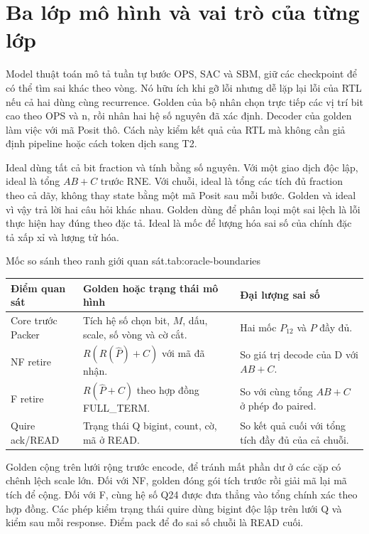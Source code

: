 \section{Ba lớp mô hình và vai trò của từng lớp}

Model thuật toán mô tả tuần tự bước OPS, SAC và SBM, giữ các
checkpoint để có thể tìm sai khác theo vòng. Nó hữu ích khi
gỡ lỗi nhưng dễ lặp lại lỗi của RTL nếu cả hai dùng cùng
recurrence. Golden của bộ nhân chọn trực tiếp các vị trí
bit cao theo OPS và n, rồi nhân hai hệ số nguyên đã xác định.
Decoder của golden làm việc với mã Posit thô. Cách này kiểm
kết quả của RTL mà không cần giả định pipeline hoặc cách
token dịch sang T2.

Ideal dùng tất cả bit fraction và tính bằng số nguyên.
Với một giao dịch độc lập, ideal là tổng $AB+C$ trước RNE.
Với chuỗi, ideal là tổng các tích đủ fraction theo cả dãy,
không thay state bằng một mã Posit sau mỗi bước. Golden và
ideal vì vậy trả lời hai câu hỏi khác nhau. Golden dùng
để phân loại một sai lệch là lỗi thực hiện hay đúng theo
đặc tả. Ideal là mốc để lượng hóa sai số của chính đặc tả
xấp xỉ và lượng tử hóa.

\begin{engineeringtable}{Mốc so sánh theo ranh giới quan sát.}{tab:oracle-boundaries}
\begin{tabularx}{\linewidth}{@{}>{\raggedright\arraybackslash}p{32mm}Y Y@{}}
\toprule
Điểm quan sát & Golden hoặc trạng thái mô hình & Đại lượng sai số \\
\midrule
Core trước Packer & Tích hệ số chọn bit, $M$, dấu, scale, số vòng và cờ cắt. & Hai mốc $P_{12}$ và $P$ đầy đủ. \\
NF retire & $R(R(\widehat P)+C)$ với mã đã nhận. & So giá trị decode của D với $AB+C$. \\
F retire & $R(\widehat P+C)$ theo hợp đồng FULL\_TERM. & So với cùng tổng $AB+C$ ở phép đo paired. \\
Quire ack/READ & Trạng thái Q bigint, count, cờ, mã ở READ. & So kết quả cuối với tổng tích đầy đủ của cả chuỗi. \\
\bottomrule
\end{tabularx}
\end{engineeringtable}

Golden cộng trên lưới rộng trước encode, để tránh mất phần
dư ở các cặp có chênh lệch scale lớn. Đối với NF, golden
đóng gói tích trước rồi giải mã lại mã tích để cộng. Đối với
F, cùng hệ số Q24 được đưa thẳng vào tổng chính xác theo hợp
đồng. Các phép kiểm trạng thái quire dùng bigint độc lập
trên lưới Q và kiểm sau mỗi response. Điểm pack để đo sai
số chuỗi là READ cuối.

